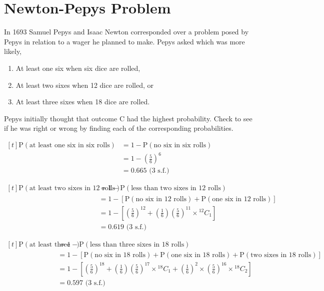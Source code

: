\documentclass[11pt,a4paper]{book}
\begin{document}
\newpage

\section{Newton-Pepys Problem}

\begin{example}

In 1693 Samuel Pepys and Isaac Newton corresponded over a problem
posed by Pepys in relation to a wager he planned to make. Pepys asked
which was more likely,

\begin{enumerate}[label=\Alph*:]

\item At least one six when six dice are rolled,

\item At least two sixes when 12 dice are rolled, or

\item At least three sixes when 18 dice are rolled.

\end{enumerate}

Pepys initially thought that outcome C had the highest probability.
Check to see if he was right or wrong by finding each of the corresponding
probabilities.

\Solution

$
\begin{aligned}[t]
\text{P}\left(\text{at least one six in six rolls}\right) & =1-\text{P}\left(\text{no six in six rolls}\right)\\
 & =1-\left(\frac{5}{6}\right)^{6}\\
 & =0.665\text{ (3 s.f.)}
\end{aligned}
$

$
\begin{aligned}[t]
\text{P}\left(\text{at least two sixes in 12 rolls}\right) & =1-\text{P}\left(\text{less than two sixes in 12 rolls}\right)\\
 & =1-\left[\text{P}\left(\text{no six in 12 rolls}\right)+\text{P}\left(\text{one six in 12 rolls}\right)\right]\\
 & =1-\left[\left(\frac{5}{6}\right)^{12}+\left(\frac{1}{6}\right)\left(\frac{5}{6}\right)^{11}\times{}^{12}C_{1}\right]\\
 & =0.619\text{ (3 s.f.)}
\end{aligned}
$

$
\begin{aligned}[t]
\text{P}\left(\text{at least three sixes in 18 rolls}\right) & =1-\text{P}\left(\text{less than three sixes in 18 rolls}\right)\\
 & =1-\left[\text{P}\left(\text{no six in 18 rolls}\right)+\text{P}\left(\text{one six in 18 rolls}\right)+\text{P}\left(\text{two sixes in 18 rolls}\right)\right]\\
 & =1-\left[\left(\frac{5}{6}\right)^{18}+\left(\frac{1}{6}\right)\left(\frac{5}{6}\right)^{17}\times{}^{18}C_{1}+\left(\frac{1}{6}\right)^{2}\times\left(\frac{5}{6}\right)^{16}\times{}^{18}C_{2}\right]\\
 & =0.597\text{ (3 s.f.)}
\end{aligned}
$


\end{example}
\end{document}
